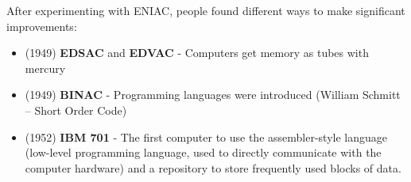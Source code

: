 \documentclass[12pt]{article}
\begin{document}
\noindent After experimenting with ENIAC, people found different ways to make significant improvements:
\begin{itemize}
    \item (1949) \textbf{EDSAC} and \textbf{EDVAC} - Computers get memory as tubes with mercury
    \item (1949) \textbf{BINAC} - Programming languages were introduced (William Schmitt – Short Order Code)
    \item (1952) \textbf{IBM 701} - The first computer to use the assembler-style language (low-level programming language, used to directly communicate with the computer hardware) and a repository to store frequently used blocks of data.\newline
\end{itemize}

\newpage
\end{document}
